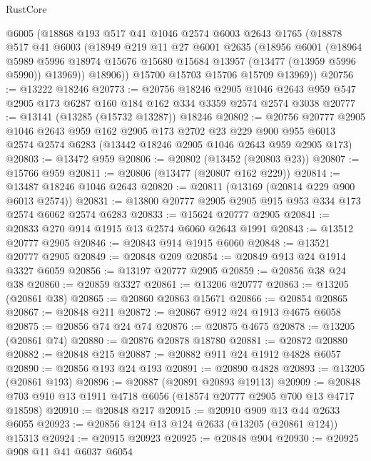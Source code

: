 \begin{lexlean}{RustCore}
\begin{coremodule}
      @6005
      (@18868
        @193
        @517
        @41
        @1046
        @2574
        @6003
        @2643
        @1765
        (@18878
          @517
          @41
          @6003
          (@18949
            @219
            @11
            @27
            @6001
            @2635
            (@18956
              @6001
              (@18964
                @5989
                @5996
                @18974
                @15676
                @15680
                @15684
                @13957
                (@13477 (@13959 @5996 @5990))
                @13969))
            @18906))
        @15700
        @15703
        @15706
        @15709
        @13969))
@20756 := @13222 @18246
@20773 := @20756
    @18246
    @2905
    @1046
    @2643
    @959
    @547
    @2905
    @173
    @6287
    @160
    @184
    @162
    @334
    @3359
    @2574
    @2574
    @3038
@20777 := @13141 (@13285 (@15732 @13287)) @18246
@20802 := @20756
    @20777
    @2905
    @1046
    @2643
    @959
    @162
    @2905
    @173
    @2702
    @23
    @229
    @900
    @955
    @6013
    @2574
    @2574
    @6283
    (@13442 @18246 @2905 @1046 @2643 @959 @2905 @173)
@20803 := @13472 @959
@20806 := @20802 (@13452 (@20803 @23))
@20807 := @15766 @959
@20811 := @20806 (@13477 (@20807 @162 @229))
@20814 := @13487 @18246 @1046 @2643
@20820 := @20811 (@13169 (@20814 @229 @900 @6013 @2574))
@20831 := @13800 @20777 @2905 @2905 @915 @953 @334 @173 @2574 @6062 @2574 @6283
@20833 := @15624 @20777 @2905
@20841 := @20833 @270 @914 @1915 @13 @2574 @6060 @2643 @1991
@20843 := @13512 @20777 @2905
@20846 := @20843 @914 @1915 @6060
@20848 := @13521 @20777 @2905
@20849 := @20848 @209
@20854 := @20849 @913 @24 @1914 @3327 @6059
@20856 := @13197 @20777 @2905
@20859 := @20856 @38 @24 @38
@20860 := @20859 @3327
@20861 := @13206 @20777
@20863 := @13205 (@20861 @38)
@20865 := @20860 @20863 @15671
@20866 := @20854 @20865
@20867 := @20848 @211
@20872 := @20867 @912 @24 @1913 @4675 @6058
@20875 := @20856 @74 @24 @74
@20876 := @20875 @4675
@20878 := @13205 (@20861 @74)
@20880 := @20876 @20878 @18780
@20881 := @20872 @20880
@20882 := @20848 @215
@20887 := @20882 @911 @24 @1912 @4828 @6057
@20890 := @20856 @193 @24 @193
@20891 := @20890 @4828
@20893 := @13205 (@20861 @193)
@20896 := @20887 (@20891 @20893 @19113)
@20909 := @20848 @703 @910 @13 @1911 @4718 @6056 (@18574 @20777 @2905 @700 @13 @4717 @18598)
@20910 := @20848 @217
@20915 := @20910 @909 @13 @44 @2633 @6055
@20923 := @20856 @124 @13 @124 @2633 (@13205 (@20861 @124)) @15313
@20924 := @20915 @20923
@20925 := @20848 @904
@20930 := @20925 @908 @11 @41 @6037 @6054

\end{coremodule}
\end{lexlean}
